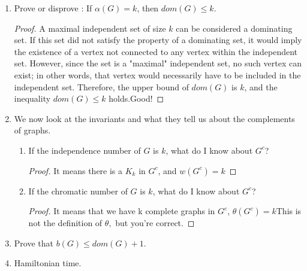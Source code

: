 \documentclass[11pt]{article}
\begin{document}
\begin{enumerate}[leftmargin=*]
\begin{enumerate}[label=\alph*.]
\begin{proof}
    \end{proof}
\end{enumerate}
\item Prove or disprove : If $\alpha(G) = k$, then $dom(G)\leq k$.
\begin{proof}
    A maximal independent set of size $k$ can be considered a dominating set. If this set did not satisfy the property of a dominating set, it would imply the existence of a vertex not connected to any vertex within the independent set. However, since the set is a "maximal" independent set, no such vertex can exist; in other words, that vertex would necessarily have to be included in the independent set. Therefore, the upper bound of $dom(G)$ is $k$, and the inequality $dom(G) \le k$ holds.\color{red}Good!\color{black}
\end{proof}
\item We now look at the invariants and what they tell us about the complements of graphs. 
\begin{enumerate}[label=\alph*.]
    \item If the independence number of $G$ is $k$, what do I know about $G^c$?
    \begin{proof}
        It means there is a $K_k$ in $G^c$, and $w(G^c)=k$
    \end{proof}
    \item If the chromatic number of $G$ is $k$, what do I know about $G^c$?
    \begin{proof}
        It means that we have k complete graphs in $G^c$, $\theta(G^c)=k$\color{red}This is not the definition of $\theta,$ but you're correct.\color{black}
    \end{proof}
\end{enumerate}
\item Prove that $b(G) \leq dom(G)+1$.
\item Hamiltonian time. 


\end{enumerate}
\end{document}
